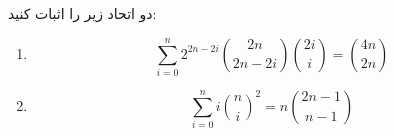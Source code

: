     \p
    دو اتحاد زیر را اثبات کنید:
    \begin{enumerate}
        \item 
        $$\sum\limits_{i=0}^{n} 2^{2n-2i} \binom{2n}{2n-2i} \binom{2i}{i} = \binom{4n}{2n}$$
        \item
        $$ \sum\limits_{i=0}^{n} i {\binom{n}{i}}^2 = n\binom{2n-1}{n-1}$$
    \end{enumerate}